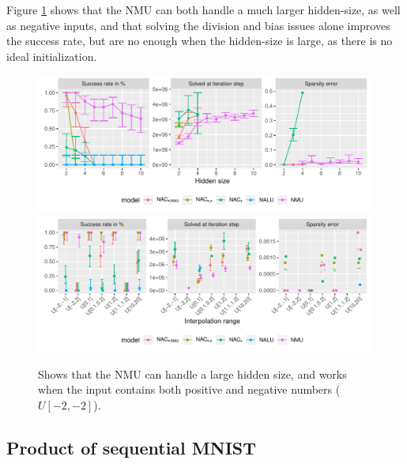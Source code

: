 Figure \ref{fig:simple-function-static-theoreical-claims-experiment} shows that the NMU can both handle a much larger hidden-size, as well as negative inputs, and that solving the division and bias issues alone improves the success rate, but are no enough when the hidden-size is large, as there is no ideal initialization.

\begin{figure}[h]
\centering
\includegraphics[width=\linewidth,trim={0 1.3cm 0 0},clip]{results/simple_function_static_mul_hidden_size.pdf}
\includegraphics[width=\linewidth,trim={0 0 0 0.809cm},clip]{results/simple_function_static_mul_range.pdf}
\caption{Shows that the NMU can handle a large hidden size, and works when the input contains both positive and negative numbers ($U[-2,-2]$).} 
\label{fig:simple-function-static-theoreical-claims-experiment}
\end{figure}

\subsection{Product of sequential MNIST}

